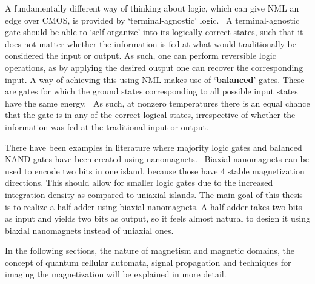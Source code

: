\documentclass[11pt,a4paper,english]{article}
\begin{document}
A fundamentally different way of thinking about logic, which can give NML an edge over CMOS, is provided by `terminal-agnostic' logic.~\cite{FactorizationMemcomputing} A terminal-agnostic gate should be able to `self-organize' into its logically correct states, such that it does not matter whether the information is fed at what would traditionally be considered the input or output. As such, one can perform reversible logic operations, as by applying the desired output one can recover the corresponding input. A way of achieving this using NML makes use of `\textbf{balanced}' gates. These are gates for which the ground states corresponding to all possible input states have the same energy.~\cite{GYP-18} As such, at nonzero temperatures there is an equal chance that the gate is in any of the correct logical states, irrespective of whether the information was fed at the traditional input or output.~\cite{gypens2020nanomagnetic} \par %
There have been examples in literature where majority logic gates and balanced NAND gates have been created using nanomagnets.~\cite{GYP-18} Biaxial nanomagnets can be used to encode two bits in one island, because those have 4 stable magnetization directions. This should allow for smaller logic gates due to the increased integration density as compared to uniaxial islands. The main goal of this thesis is to realize a half adder using biaxial nanomagnets. A half adder takes two bits as input and yields two bits as output, so it feels almost natural to design it using biaxial nanomagnets instead of uniaxial ones.


In the following sections, the nature of magnetism and magnetic domains, the concept of quantum cellular automata, signal propagation and techniques for imaging the magnetization will be explained in more detail.
\end{document}
